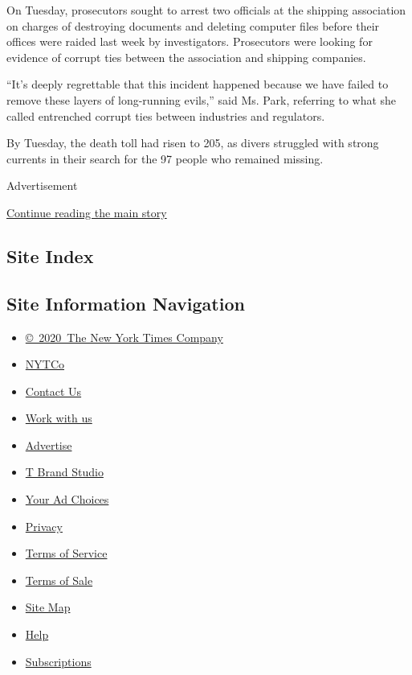 On Tuesday, prosecutors sought to arrest two officials at the shipping
association on charges of destroying documents and deleting computer
files before their offices were raided last week by investigators.
Prosecutors were looking for evidence of corrupt ties between the
association and shipping companies.

``It's deeply regrettable that this incident happened because we have
failed to remove these layers of long-running evils,'' said Ms. Park,
referring to what she called entrenched corrupt ties between industries
and regulators.

By Tuesday, the death toll had risen to 205, as divers struggled with
strong currents in their search for the 97 people who remained missing.

Advertisement

\protect\hyperlink{after-bottom}{Continue reading the main story}

\hypertarget{site-index}{%
\subsection{Site Index}\label{site-index}}

\hypertarget{site-information-navigation}{%
\subsection{Site Information
Navigation}\label{site-information-navigation}}

\begin{itemize}
\tightlist
\item
  \href{https://help.nytimes.com/hc/en-us/articles/115014792127-Copyright-notice}{©~2020~The
  New York Times Company}
\end{itemize}

\begin{itemize}
\tightlist
\item
  \href{https://www.nytco.com/}{NYTCo}
\item
  \href{https://help.nytimes.com/hc/en-us/articles/115015385887-Contact-Us}{Contact
  Us}
\item
  \href{https://www.nytco.com/careers/}{Work with us}
\item
  \href{https://nytmediakit.com/}{Advertise}
\item
  \href{http://www.tbrandstudio.com/}{T Brand Studio}
\item
  \href{https://www.nytimes.com/privacy/cookie-policy\#how-do-i-manage-trackers}{Your
  Ad Choices}
\item
  \href{https://www.nytimes.com/privacy}{Privacy}
\item
  \href{https://help.nytimes.com/hc/en-us/articles/115014893428-Terms-of-service}{Terms
  of Service}
\item
  \href{https://help.nytimes.com/hc/en-us/articles/115014893968-Terms-of-sale}{Terms
  of Sale}
\item
  \href{https://spiderbites.nytimes.com}{Site Map}
\item
  \href{https://help.nytimes.com/hc/en-us}{Help}
\item
  \href{https://www.nytimes.com/subscription?campaignId=37WXW}{Subscriptions}
\end{itemize}
